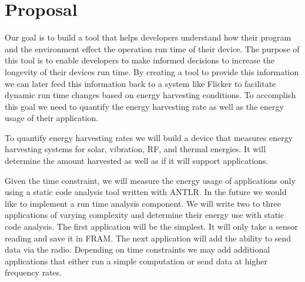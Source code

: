 \section{Proposal} %
\label{sec:proposal}

Our goal is to build a tool that helps developers understand how their program and the environment effect the operation run time of their device.
The purpose of this tool is to enable developers to make informed decisions to increase the longevity of their devices run time.
By creating a tool to provide this information we can later feed this information back to a system like Flicker \cite{flicker} to facilitate dynamic run time changes based on energy harvesting conditions.
To accomplish this goal we need to quantify the energy harvesting rate as well as the energy usage of their application.

To quantify energy harvesting rates we will build a device that measures energy harvesting systems for solar, vibration, RF, and thermal energies.
It will determine the amount harvested as well as if it will support applications.

Given the time constraint, we will measure the energy usage of applications only using a static code analysis tool written with ANTLR.
In the future we would like to implement a run time analysis component.
We will write two to three applications of varying complexity and determine their energy use with static code analysis.
The first application will be the simplest.
It will only take a sensor reading and save it in FRAM.
The next application will add the ability to send data via the radio.
Depending on time constraints we may add additional applications that either run a simple computation or send data at higher frequency rates.
